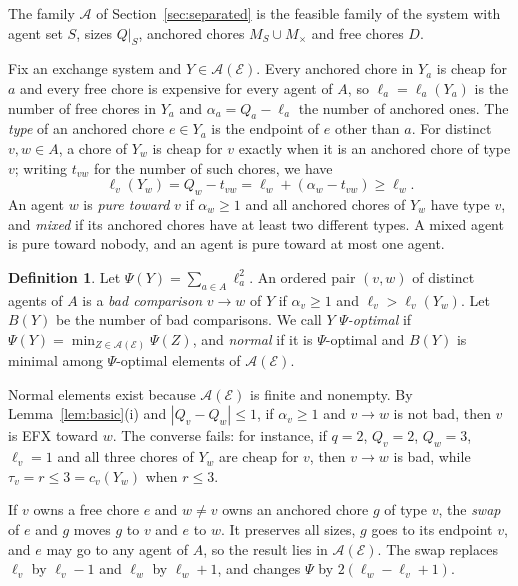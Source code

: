 \documentclass{amsart}
\numberwithin{equation}{section}
\theoremstyle{definition}
\newtheorem{definition}[theorem]{Definition}
\theoremstyle{remark}
\newcommand{\cA}{\mathcal{A}}
\newcommand{\cE}{\mathcal{E}}
\begin{document}
The family $\cA$ of Section~\ref{sec:separated} is the feasible family of the system with agent set $S$, sizes $Q|_S$, anchored chores $M_S\cup M_\times$ and free chores $D$.

Fix an exchange system and $Y\in\cA(\cE)$. Every anchored chore in $Y_a$ is cheap for $a$ and every free chore is expensive for every agent of $A$, so $\ell_a=\ell_a(Y_a)$ is the number of free chores in $Y_a$ and $\alpha_a=Q_a-\ell_a$ the number of anchored ones. The \emph{type} of an anchored chore $e\in Y_a$ is the endpoint of $e$ other than $a$. For distinct $v,w\in A$, a chore of $Y_w$ is cheap for $v$ exactly when it is an anchored chore of type $v$; writing $t_{vw}$ for the number of such chores, we have
\begin{equation}\label{eq:lvw}
\ell_v(Y_w)=Q_w-t_{vw}=\ell_w+(\alpha_w-t_{vw})\ge\ell_w .
\end{equation}
An agent $w$ is \emph{pure toward} $v$ if $\alpha_w\ge1$ and all anchored chores of $Y_w$ have type $v$, and \emph{mixed} if its anchored chores have at least two different types. A mixed agent is pure toward nobody, and an agent is pure toward at most one agent.

\begin{definition}\label{def:normal}
Let $\Psi(Y)=\sum_{a\in A}\ell_a^2$. An ordered pair $(v,w)$ of distinct agents of $A$ is a \emph{bad comparison} $v\to w$ of $Y$ if $\alpha_v\ge1$ and $\ell_v>\ell_v(Y_w)$. Let $B(Y)$ be the number of bad comparisons. We call $Y$ \emph{$\Psi$-optimal} if $\Psi(Y)=\min_{Z\in\cA(\cE)}\Psi(Z)$, and \emph{normal} if it is $\Psi$-optimal and $B(Y)$ is minimal among $\Psi$-optimal elements of $\cA(\cE)$.
\end{definition}

Normal elements exist because $\cA(\cE)$ is finite and nonempty. By Lemma~\ref{lem:basic}(i) and $|Q_v-Q_w|\le1$, if $\alpha_v\ge1$ and $v\to w$ is not bad, then $v$ is EFX toward $w$. The converse fails: for instance, if $q=2$, $Q_v=2$, $Q_w=3$, $\ell_v=1$ and all three chores of $Y_w$ are cheap for $v$, then $v\to w$ is bad, while $\tau_v=r\le 3=c_v(Y_w)$ when $r\le 3$.

If $v$ owns a free chore $e$ and $w\ne v$ owns an anchored chore $g$ of type $v$, the \emph{swap} of $e$ and $g$ moves $g$ to $v$ and $e$ to $w$. It preserves all sizes, $g$ goes to its endpoint $v$, and $e$ may go to any agent of $A$, so the result lies in $\cA(\cE)$. The swap replaces $\ell_v$ by $\ell_v-1$ and $\ell_w$ by $\ell_w+1$, and changes $\Psi$ by $2(\ell_w-\ell_v+1)$.
\end{document}
